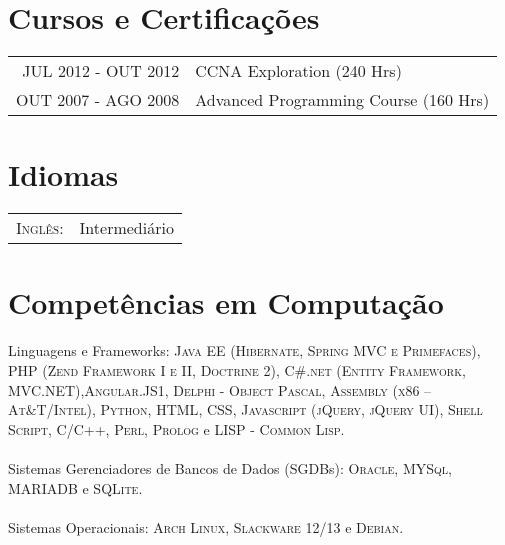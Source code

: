 \documentclass[a4paper,10pt]{article} %
\begin{document}

\section{Cursos e Certificações}

\begin{tabular}{rl}
  \textsc{JUL} 2012 - \textsc{OUT} 2012 & CCNA Exploration \footnotesize(240 Hrs)\normalsize\\
  \textsc{OUT} 2007 - \textsc{AGO} 2008 & Advanced Programming Course \footnotesize(160 Hrs)\normalsize\\

\end{tabular}


\section{Idiomas}

\begin{tabular}{rl}
\textsc{Inglês:} & Intermediário\\
\end{tabular}


\section{Competências em Computação}

  Linguagens e Frameworks:  \textsc{Java EE (Hibernate, Spring MVC e Primefaces)}, \textsc{PHP (Zend Framework I e II, Doctrine 2)}, \textsc{C\#.net (Entity Framework, MVC.NET)},\textsc{Angular.JS1}, \textsc{Delphi - Object Pascal}, \textsc{Assembly (x86 -- At\&T/Intel)}, \textsc{Python}, \textsc{HTML}, \textsc{CSS}, \textsc{Javascript (jQuery, jQuery UI)}, \textsc{Shell Script}, \textsc{C/C++}, \textsc{Perl}, \textsc{Prolog} e \textsc{LISP - Common Lisp}. 
\\
\\
  Sistemas Gerenciadores de Bancos de Dados (SGDBs):  \textsc{Oracle}, \textsc{MYSql}, \textsc{MARIADB} e \textsc{SQLite}. 
\\
\\
  Sistemas Operacionais: \textsc{Arch Linux}, \textsc{Slackware 12/13} e \textsc{Debian}.
\end{document}

